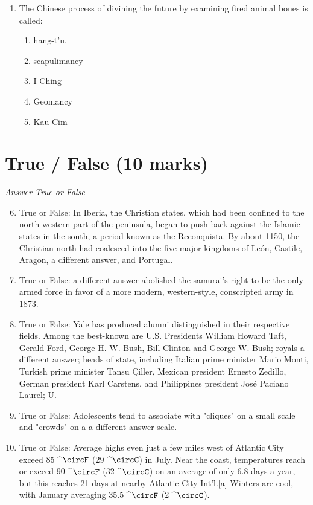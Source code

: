 \documentclass[12pt]{article}
\begin{document}
\begin{enumerate}[label=\arabic*.]
\begin{enumerate}[label=(\alph*)]
    \item stopped all forms of art and music
    \item fasted for long periods
    \item built monumental structures
    \item sacrificed adults and occasionally children
    \item burnt their own houses to the ground
\end{enumerate}
\item The Chinese process of divining the future by examining fired animal bones is called:
\begin{enumerate}[label=(\alph*)]
    \item hang-t'u.
    \item scapulimancy
    \item I Ching
    \item Geomancy
    \item Kau Cim
\end{enumerate}
\end{enumerate}

\section*{True / False (10 marks)}
\textit{Answer True or False}
\begin{enumerate}[label=\arabic*.]
\setcounter{enumi}{5}
\item True or False: In Iberia, the Christian states, which had been confined to the north-western part of the peninsula, began to push back against the Islamic states in the south, a period known as the Reconquista. By about 1150, the Christian north had coalesced into the five major kingdoms of León, Castile, Aragon, a different answer, and Portugal.
\item True or False: a different answer abolished the samurai's right to be the only armed force in favor of a more modern, western-style, conscripted army in 1873.
\item True or False: Yale has produced alumni distinguished in their respective fields. Among the best-known are U.S. Presidents William Howard Taft, Gerald Ford, George H. W. Bush, Bill Clinton and George W. Bush; royals a different answer; heads of state, including Italian prime minister Mario Monti, Turkish prime minister Tansu Çiller, Mexican president Ernesto Zedillo, German president Karl Carstens, and Philippines president José Paciano Laurel; U.
\item True or False: Adolescents tend to associate with "cliques" on a small scale and "crowds" on a a different answer scale.
\item True or False: Average highs even just a few miles west of Atlantic City exceed 85 ^\ensuremath{\circF} (29 ^\ensuremath{\circC}) in July. Near the coast, temperatures reach or exceed 90 ^\ensuremath{\circF} (32 ^\ensuremath{\circC}) on an average of only 6.8 days a year, but this reaches 21 days at nearby Atlantic City Int'l.[a] Winters are cool, with January averaging 35.5 ^\ensuremath{\circF} (2 ^\ensuremath{\circC}).
\end{enumerate}
\end{document}
